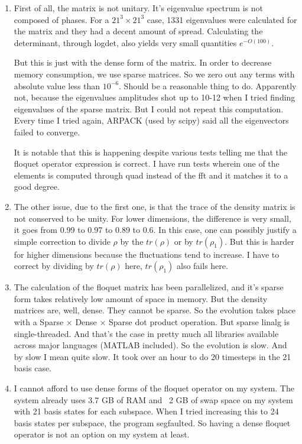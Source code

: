 \documentclass[12pt]{article}
\begin{document}
\begin{enumerate}
    \item First of all, the matrix is not unitary. It's eigenvalue
    spectrum is not composed of phases. For a $21^3 \times 21^3$
    case, 1331 eigenvalues were calculated for the matrix and they
    had a decent amount of spread. Calculating the determinant,
    through logdet, also yields very small quantities $e^{-O(100)}$.

    But this is just with the dense form of the matrix. In order
    to decrease memory consumption, we use sparse matrices. So we zero
    out any terms with absolute value less than $10^{-6}$. Should be a
    reasonable thing to do. Apparently not, because the eigenvalues
    amplitudes shot up to 10-12 when I tried finding eigenvalues of the
    sparse matrix. But I could not repeat this computation.
    Every time I tried again, ARPACK (used by scipy) said all the
    eigenvectors failed to converge.

    It is notable that this is happening despite various tests
    telling me that the floquet operator expression is correct. I have
    run tests wherein one of the elements is computed through quad instead
    of the fft and it matches it to a good degree.

    \item The other issue, due to the first one, is that the trace of the
    density matrix is not conserved to be unity. For lower dimensions, the
    difference is very small, it goes from 0.99 to 0.97 to 0.89 to 0.6.
    In this case, one can possibly justify a simple correction to divide
    $\rho$ by the $tr(\rho)$ or by $tr(\rho_1)$. But this is harder for
    higher dimensions because the fluctuations tend to increase. I have to
    correct by dividing by $tr(\rho)$ here, $tr(\rho_1)$ also fails here.

    \item The calculation of the floquet matrix has been parallelized,
    and it's sparse form takes relatively low amount of space in memory.
    But the density matrices are, well, dense. They cannot be sparse.
    So the evolution takes place with a Sparse $\times$ Dense $\times$
    Sparse dot product operation. But sparse linalg is single-threaded.
    And that's the case in pretty much all libraries available across
    major languages (MATLAB included). So the evolution is slow. And
    by slow I mean quite slow. It took over an hour to do 20 timesteps
    in the 21 basis case.

    \item I cannot afford to use dense forms of the floquet operator on my
    system. The system already uses 3.7 GB of RAM and ~2 GB of swap
    space on my system with 21 basis states for each subspace. When
    I tried increasing this to 24 basis states per subspace, the
    program segfaulted. So having a dense floquet operator is not an
    option on my system at least.


\end{enumerate}
\end{document}
